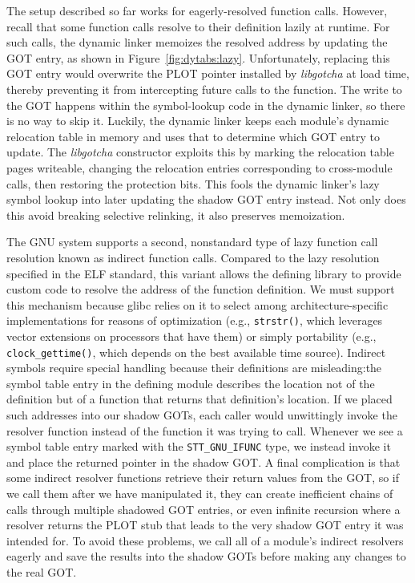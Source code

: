 The setup described so far works for eagerly-resolved function calls.  However,
recall that some function calls resolve to their definition lazily at runtime.  For
such calls, the dynamic linker memoizes the resolved address by updating the GOT
entry, as shown in Figure~\ref{fig:dytabs:lazy}.  Unfortunately, replacing this GOT
entry would overwrite the PLOT pointer installed by \textit{libgotcha} at load time,
thereby preventing it from intercepting future calls to the function.  The write to
the GOT happens within the symbol-lookup code in the dynamic linker, so there is no
way to skip it.  Luckily, the dynamic linker keeps each module's dynamic relocation
table in memory and uses that to determine which GOT entry to update.  The
\textit{libgotcha} constructor exploits this by marking the relocation table pages
writeable, changing the relocation entries corresponding to cross-module calls, then
restoring the protection bits.  This fools the dynamic linker's lazy symbol lookup
into later updating the shadow GOT entry instead.  Not only does this avoid breaking
selective relinking, it also preserves memoization.

The GNU system supports a second, nonstandard type of lazy function call resolution
known as indirect function calls.  Compared to the lazy resolution specified in the
ELF standard, this variant allows the defining library to provide custom code to
resolve the address of the function definition.  We must support this mechanism
because glibc relies on it to select among architecture-specific implementations for
reasons of optimization (e.g., \texttt{strstr()}, which leverages vector extensions
on processors that have them) or simply portability (e.g., \texttt{clock\_gettime()},
which depends on the best available time source).  Indirect symbols require special
handling because their definitions are misleading:\@ the symbol table entry in the
defining module describes the location not of the definition but of a function that
returns that definition's location.  If we placed such addresses into our shadow
GOTs, each caller would unwittingly invoke the resolver function instead of the
function it was trying to call.  Whenever we see a symbol table entry marked with the
\texttt{STT\_GNU\_IFUNC} type, we instead invoke it and place the returned pointer in
the shadow GOT.  A final complication is that some indirect resolver functions
retrieve their return values from the GOT, so if we call them after we have
manipulated it, they can create inefficient chains of calls through multiple shadowed
GOT entries, or even infinite recursion where a resolver returns the PLOT stub that
leads to the very shadow GOT entry it was intended for.  To avoid these problems, we
call all of a module's indirect resolvers eagerly and save the results into the
shadow GOTs before making any changes to the real GOT.


